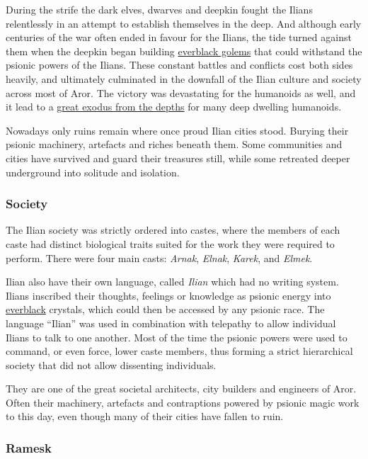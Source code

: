 During the strife the dark elves, dwarves and deepkin fought the Ilians
relentlessly in an attempt to establish themselves in the deep. And although
early centuries of the war often ended in favour for the Ilians, the tide
turned against them when the deepkin began building \hyperref[sec:Everblack
  Golem]{everblack golems} that could withstand the psionic powers of the
Ilians. These constant battles and conflicts cost both sides heavily, and
ultimately culminated in the downfall of the Ilian culture and society across
most of Aror. The victory was devastating for the humanoids as well, and it
lead to a \hyperref[sec:Exodus from the Depths]{great exodus from the depths}
for many deep dwelling humanoids.

Nowadays only ruins remain where once proud Ilian cities stood. Burying their
psionic machinery, artefacts and riches beneath them. Some communities and
cities have survived and guard their treasures still, while some retreated
deeper underground into solitude and isolation.

\subsubsection{Society}

The Ilian society was strictly ordered into castes, where the members of each
caste had distinct biological traits suited for the work they were required to
perform. There were four main casts: \emph{Arnak}, \emph{Elnak}, \emph{Karek},
and \emph{Elmek}.

Ilian also have their own language, called \emph{Ilian} which had no writing
system. Ilians inscribed their thoughts, feelings or knowledge as psionic
energy into \hyperref[sec:Everblack]{everblack} crystals, which could then be
accessed by any psionic race. The language ``Ilian'' was used in combination
with telepathy to allow individual Ilians to talk to one another. Most of the
time the psionic powers were used to command, or even force, lower caste
members, thus forming a strict hierarchical society that did not allow
dissenting individuals.

They are one of the great societal architects, city builders and engineers of
Aror. Often their machinery, artefacts and contraptions powered by psionic
magic work to this day, even though many of their cities have fallen to ruin.

\subsubsection{Ramesk}
\label{sec:Ramesk}

